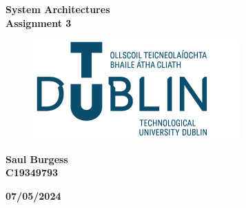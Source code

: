 \documentclass[oneside,12pt]{book}
\begin{document}

\begin{titlepage}
	\begin{center}
		\vspace*{1.5cm}

		\Huge
		\textbf{System Architectures}
		\\
		\textbf{Assignment 3}

		\vspace{1cm}
		\begin{figure}[H]
			\centering
			\hspace{7mm} \includegraphics[scale=0.5]{TU_logo}
		\end{figure}

		\vspace{1.5cm}

		\textbf{Saul Burgess}
		\\
		\textbf{C19349793}

		\vfill
		\large
		\vspace{0.5cm}
		\textbf{07/05/2024}
		\vspace{0.8cm}

	\end{center}
\end{titlepage}

\pagestyle{fancy}
\fancyhf{}
\fancyfoot[CE,CO]{\thepage}
\renewcommand{\headrulewidth}{0pt}





\newpage
\tableofcontents

\newpage

\fancyhead[RE,LO]{\leftmark}
\renewcommand{\headrulewidth}{2pt}
\end{document}
